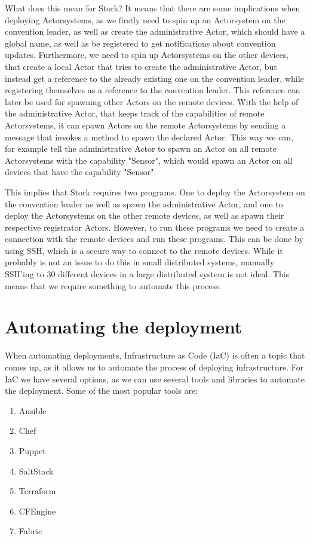 \documentclass[a4paper]{article}
\begin{document}
What does this mean for Stork? It means that there are some implications when deploying Actorsystems, as we firstly need to spin up an Actorsystem on the convention leader, as well as create the administrative Actor, which should have a global name, as well as be registered to get notifications about convention updates. Furthermore, we need to spin up Actorsystems on the other devices, that create a local Actor that tries to create the administrative Actor, but instead get a reference to the already existing one on the convention leader, while registering themselves as a reference to the convention leader. This reference can later be used for spawning other Actors on the remote devices. With the help of the administrative Actor, that keeps track of the capabilities of remote Actorsystems, it can spawn Actors on the remote Actorsystems by sending a message that invokes a method to spawn the declared Actor. This way we can, for example tell the administrative Actor to spawn an Actor on all remote Actorsystems with the capability "Sensor", which would spawn an Actor on all devices that have the capability "Sensor".

This implies that Stork requires two programs. One to deploy the Actorsystem on the convention leader as well as spawn the administrative Actor, and one to deploy the Actorsystems on the other remote devices, as well as spawn their respective registrator Actors. However, to run these programs we need to create a connection with the remote devices and run these programs. This can be done by using SSH, which is a secure way to connect to the remote devices. While it probably is not an issue to do this in small distributed systems, manually SSH'ing to 30 different devices in a large distributed system is not ideal. This means that we require something to automate this process.

\section{Automating the deployment}
When automating deployments, Infrastructure as Code (IaC) is often a topic that comes up, as it allows us to automate the process of deploying infrastructure. For IaC we have several options, as we can use several tools and libraries to automate the deployment. Some of the most popular tools are:
\begin{enumerate}
    \item Ansible
    \item Chef
    \item Puppet
    \item SaltStack
    \item Terraform
    \item CFEngine
    \item Fabric
\end{enumerate}
\printbibliography
\end{document}
